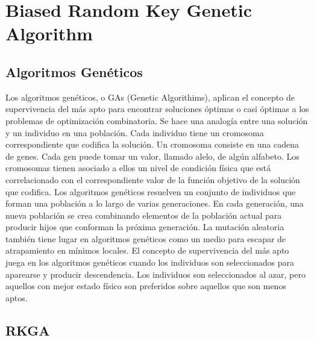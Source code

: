 
\chapter{Biased Random Key Genetic Algorithm}

\section{Algoritmos Genéticos}

Los algoritmos genéticos, o GAs (Genetic Algorithims), \cite{Goldberg} aplican el concepto de supervivencia del más apto para encontrar soluciones óptimas o casi óptimas a los problemas de optimización combinatoria. Se hace una analogía entre una solución y un individuo en una población. Cada individuo tiene un cromosoma correspondiente que codifica la solución. Un cromosoma consiste en una cadena de genes. Cada gen puede tomar un valor, llamado alelo, de algún alfabeto. Los cromosomas tienen asociado a ellos un nivel de condición física que está correlacionado con el correspondiente valor de la función objetivo de la solución que codifica. Los algoritmos genéticos resuelven un conjunto de individuos que forman una población a lo largo de varias generaciones. En cada generación, una nueva población se crea combinando elementos de la población actual para producir hijos que conforman la próxima generación. La mutación aleatoria también tiene lugar en algoritmos genéticos como un medio para escapar de atrapamiento en mínimos locales. El concepto de supervivencia del más apto juega en los algoritmos genéticos cuando los individuos son seleccionados para aparearse y producir descendencia. Los individuos son seleccionados al azar, pero aquellos con mejor estado físico son preferidos sobre aquellos que son menos aptos.

\section{RKGA}

